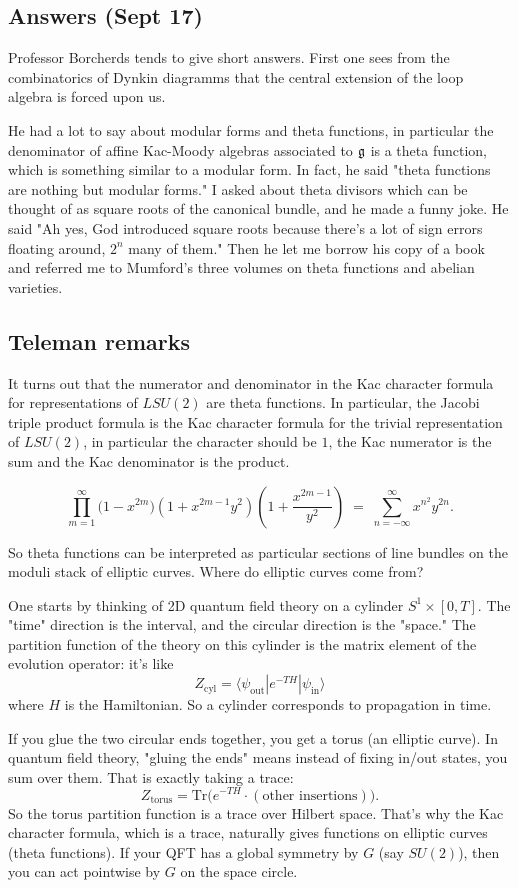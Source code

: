 \documentclass[12pt]{article}
\begin{document}
\subsection*{Answers (Sept 17)}
Professor Borcherds tends to give short answers. First one sees from the combinatorics of Dynkin diagramms that the central extension of the loop algebra is forced upon us.

He had a lot to say about modular forms and theta functions, in particular the denominator of affine Kac-Moody algebras associated to $\mathfrak{g}$ is a theta function, which is something similar to a modular form. In fact, he said "theta functions are nothing but modular forms." I asked about theta divisors which can be thought of as square roots of the canonical bundle, and he made a funny joke. He said "Ah yes, God introduced square roots because there's a lot of sign errors floating around, $2^n$ many of them." Then he let me borrow his copy of a book and referred me to Mumford's three volumes on theta functions and abelian varieties.

\subsection*{Teleman remarks}
It turns out that the numerator and denominator in the Kac character formula for representations of $LSU(2)$ are theta functions. In particular, the Jacobi triple product formula is the Kac character formula for the trivial representation of $LSU(2)$, in particular the character should be $1$, the Kac numerator is the sum and the Kac denominator is the product.

\[
\prod_{m=1}^\infty 
\bigl(1 - x^{2m}\bigr)
\left(1 + x^{2m-1} y^2\right)
\left(1 + \frac{x^{2m-1}}{y^2}\right)
\;=\;
\sum_{n=-\infty}^{\infty} x^{n^2} y^{2n}.
\]

So theta functions can be interpreted as particular sections of line bundles on the moduli stack of elliptic curves. Where do elliptic curves come from? 

One starts by thinking of 2D quantum field theory on a cylinder $S^1 \times [0,T]$. The "time" direction is the interval, and the circular direction is the "space." The partition function of the theory on this cylinder is the matrix element of the evolution operator: it's like 
\[
Z_{\text{cyl}} = \langle \psi_{\text{out}} | e^{-T H} | \psi_{\text{in}} \rangle
\] 
where $H$ is the Hamiltonian. So a cylinder corresponds to propagation in time.

If you glue the two circular ends together, you get a torus (an elliptic curve). In quantum field theory, "gluing the ends" means instead of fixing in/out states, you sum over them. That is exactly taking a trace:
\[
Z_{\text{torus}} = \mathrm{Tr}\big( e^{-T H}\cdot(\text{other insertions})\big).
\]
So the torus partition function is a trace over Hilbert space. That's why the Kac character formula, which is a trace, naturally gives functions on elliptic curves (theta functions). If your QFT has a global symmetry by $G$ (say $SU(2)$), then you can act pointwise by $G$ on the space circle.
\end{document}
